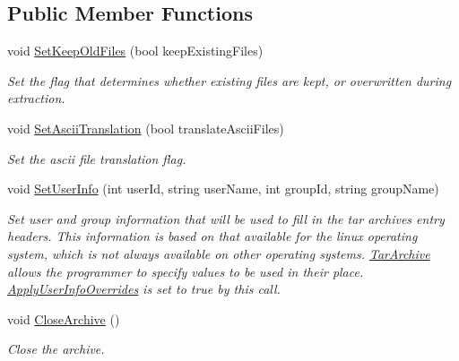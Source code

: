 \subsection*{Public Member Functions}
\begin{DoxyCompactItemize}
\item 
void \hyperlink{class_i_c_sharp_code_1_1_sharp_zip_lib_1_1_tar_1_1_tar_archive_aebe545a70c0840ed05e654fdd1fced77}{Set\+Keep\+Old\+Files} (bool keep\+Existing\+Files)
\begin{DoxyCompactList}\small\item\em Set the flag that determines whether existing files are kept, or overwritten during extraction. \end{DoxyCompactList}\item 
void \hyperlink{class_i_c_sharp_code_1_1_sharp_zip_lib_1_1_tar_1_1_tar_archive_abc5d5a5ba64d880abced06346837fe62}{Set\+Ascii\+Translation} (bool translate\+Ascii\+Files)
\begin{DoxyCompactList}\small\item\em Set the ascii file translation flag. \end{DoxyCompactList}\item 
void \hyperlink{class_i_c_sharp_code_1_1_sharp_zip_lib_1_1_tar_1_1_tar_archive_aa791e3eeee7dfc8aedd1a514f1bc08e0}{Set\+User\+Info} (int user\+Id, string user\+Name, int group\+Id, string group\+Name)
\begin{DoxyCompactList}\small\item\em Set user and group information that will be used to fill in the tar archive\textquotesingle{}s entry headers. This information is based on that available for the linux operating system, which is not always available on other operating systems. \hyperlink{class_i_c_sharp_code_1_1_sharp_zip_lib_1_1_tar_1_1_tar_archive}{Tar\+Archive} allows the programmer to specify values to be used in their place. \hyperlink{class_i_c_sharp_code_1_1_sharp_zip_lib_1_1_tar_1_1_tar_archive_a94d90eb52245f63a5ad06fb0289104ff}{Apply\+User\+Info\+Overrides} is set to true by this call. \end{DoxyCompactList}\item 
void \hyperlink{class_i_c_sharp_code_1_1_sharp_zip_lib_1_1_tar_1_1_tar_archive_a45dea83a56efc9565e01f80c3af671d4}{Close\+Archive} ()
\begin{DoxyCompactList}\small\item\em Close the archive. \end{DoxyCompactList}\item 

\end{DoxyCompactItemize}

